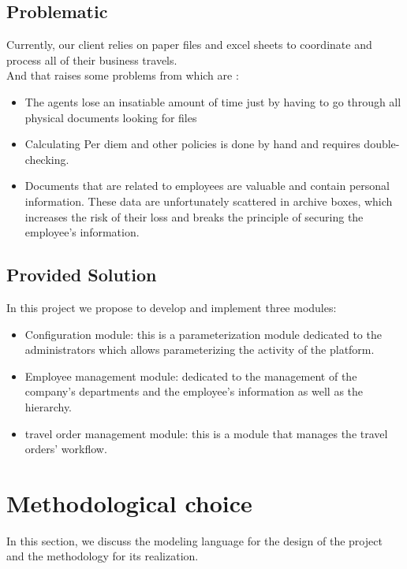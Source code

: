 \subsection{Problematic}
Currently, our client relies on paper files and excel sheets to coordinate and process all of their business travels.\\
And that raises some problems from which are :
\begin{itemize}
\item The agents lose an insatiable amount of time just by having to go through all physical documents looking for files
\item Calculating Per diem and other policies is done by hand and requires double-checking.
\item Documents that are related to employees are valuable and contain personal information. These data are unfortunately scattered in archive boxes, which increases the risk of their loss and breaks the principle of securing the employee's information.
\end{itemize}
\subsection{Provided Solution}
In this project we propose to develop and implement three modules:
\begin{itemize}
\item Configuration module: this is a parameterization module dedicated to the administrators which allows parameterizing the activity of the platform.  
\item Employee management module: dedicated to the management of the company's departments and the employee's information as well as the hierarchy.
\item travel order management module: this is a module that manages the travel orders' workflow.
\end{itemize}





\section{Methodological choice}
In this section, we discuss the modeling language for the design of the
project and the methodology for its realization.
